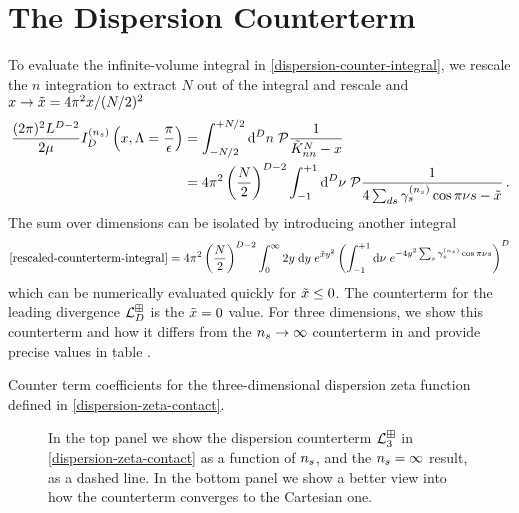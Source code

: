 \section{The Dispersion Counterterm}
\label{sec:dispersion-counterterm}

To evaluate the infinite-volume integral in \eqref{dispersion-counter-integral}, we rescale the $n$ integration to extract $N$ out of the integral and rescale and $x \to \tilde{x} = 4 \pi^2  x/(N/2)^2$
\begin{align}\label{eq:rescaled-counterterm-integral}
	\frac{(2\pi)^2L^{D-2}}{2\mu}
	I_D^{(n_s)}
	\left(x, \Lambda = \frac{\pi}{\epsilon}\right)
	&=
    \int_{-N/2}^{+N/2} \mathrm{d}^Dn\; \mathcal{P} \frac{1}{\tilde K_{nn}^N - x}
    \\ &=
    4\pi^2 \left(\frac{N}{2}\right)^{D-2} \int_{-1}^{+1} \mathrm{d}^D\nu\; \mathcal{P} \frac{1}{4\sum_{ds} \gamma^{({n_s})}_s \cos \pi \nu s - \tilde{x}}
    \, .
\end{align}
The sum over dimensions can be isolated by introducing another integral
\begin{equation}
    \label{eq:dispersion counterterm}
    \eqref{rescaled-counterterm-integral}
    =
    4 \pi^2 \left(\frac{N}{2}\right)^{D-2}\int_{0}^{\infty} 2y\; \mathrm{d}y\; e^{\xtilde y^2}\left(\int_{-1}^{+1} \mathrm{d}\nu\; e^{-4y^2 \sum_s \gamma_s^{(\nstep)} \cos \pi \nu s}\right)^D
\end{equation}
which can be numerically evaluated quickly for $\tilde{x}\leq0$.
The counterterm for the leading divergence $\mathcal{L}_D^{\boxplus}$ is the $\tilde{x}=0$ value.
For three dimensions, we show this counterterm and how it differs from the ${n_s} \to \infty$ counterterm in  and provide precise values in table .


\begin{table}[htb]
    
    \caption{
    	\label{tab:diserpersion-zeta-3d-counterterm-counterterm}
		Counter term coefficients for the three-dimensional dispersion zeta function defined in \eqref{dispersion-zeta-contact}.
    }
\end{table}

\begin{figure}[htb]
    \scalebox{0.9}{}
    \caption{
    	In the top panel we show the dispersion counterterm $\mathcal{L}^{\boxplus}_{3}$ in \eqref{dispersion-zeta-contact} as a function of ${n_s}$, and the ${n_s}=\infty$ result, as a dashed line.
	In the bottom panel we show a better view into how the counterterm converges to the Cartesian one.
    }
    \label{fig:nstep counterterm}
\end{figure}
